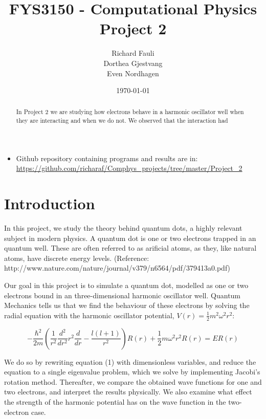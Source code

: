 \documentclass[norsk,a4paper,12pt]{article}
\title{FYS3150 - Computational Physics\\\vspace{2mm} \Large{Project 2}}
\author{\large Richard Fauli\\ Dorthea Gjestvang\\ Even Nordhagen}
\date{\today}
\begin{document}
\maketitle

\begin{abstract}
In Project 2 we are studying how electrons behave in a harmonic oscillator well when they are interacting and when we do not. We observed that the interaction had
\end{abstract}
\begin{itemize}
\item Github repository containing programs and results are in: \url{https://github.com/richaraf/Comphys_projects/tree/master/Project_2}
\end{itemize}
\section{Introduction}
In this project, we study the theory behind quantum dots, a highly relevant subject in modern physics. A quantum dot is one or two electrons trapped in an quantum well. These are often referred to as arificial atoms, as they, like natural atoms, have discrete energy levels. (Reference: http://www.nature.com/nature/journal/v379/n6564/pdf/379413a0.pdf)\par
\vspace{3mm}

Our goal in this project is to simulate a quantum dot, modelled as one or two electrons bound in an three-dimensional harmonic oscillator well. Quantum Mechanics tells us that we find the behaviour of these electrons by solving the radial equation with the harmonic oscillator potential, $V(r) = \frac{1}{2}m^2\omega^2r^2$:

\begin{equation}
    - \frac{\hbar^2}{2m}(\frac{1}{r^2}\frac{d^2}{dr^2}r^2\frac{d}{dr} - \frac{l(l+1)}{r^2})R(r) + \frac{1}{2}m\omega^2r^2R(r) = ER(r)
\end{equation}
\vspace{3mm}

We do so by rewriting equation (1) with dimensionless variables, and reduce the equation to a single eigenvalue problem, which we solve by implementing Jacobi's rotation method. Thereafter, we compare the obtained wave functions for one and two electrons, and interpret the results physically. We also examine what effect the strength of the harmonic potential has on the wave function in the two-electron case.
\end{document}
